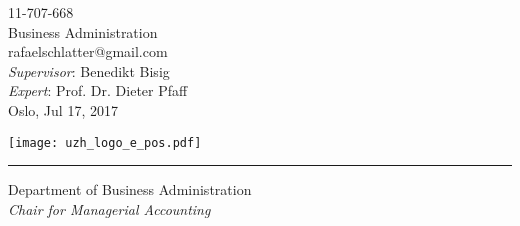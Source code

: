 \documentclass[marklength=0mm,
    coverwidth=210mm,
    coverheight=297mm,
    bleedwidth=3mm,
    spinewidth=5.9mm,cmyk]{bookcover}
\begin{document}
{\begin{minipage}[c]{.8\textwidth}
\begin{minipage}{0.5\linewidth}
11-707-668\\
Business Administration\\
rafaelschlatter@gmail.com\\

\textit{Supervisor}:
Benedikt Bisig\\
\textit{Expert}: Prof. Dr. Dieter Pfaff\\

Oslo, Jul 17, 2017
\end{minipage}
%
\begin{minipage}{0.5\linewidth}
\end{minipage}

\vspace{2cm}

\begin{minipage}{0.6\linewidth}
\texttt{[image: uzh\_logo\_e\_pos.pdf]}
\end{minipage} \hspace{15pt}
%
\begin{minipage}{0.02\linewidth}
    \rule{1pt}{30pt}
\end{minipage} \hspace{-5pt}
%
\begin{minipage}{0.4\linewidth}
\vspace{5pt}
\small{Department of Business Administration\\ \textit{Chair for Managerial Accounting}}
\end{minipage}
\end{minipage}
}


\end{document}
